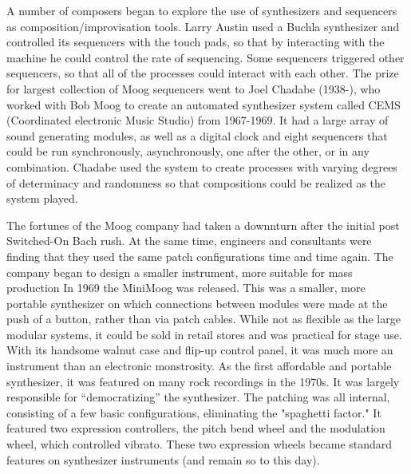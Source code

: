 A number of composers began to explore the use of synthesizers and sequencers as composition/improvisation tools. Larry Austin used a Buchla synthesizer and controlled its sequencers with the touch pads, so that by interacting with the machine he could control the rate of sequencing. Some sequencers triggered other sequencers, so that all of the processes could interact with each other. The prize for largest collection of Moog sequencers went to Joel Chadabe (1938-), who worked with Bob Moog to create an automated synthesizer system called CEMS (Coordinated electronic Music Studio) from 1967-1969. It had a large array of sound generating modules, as well as a digital clock and eight sequencers that could be run synchronously, asynchronously, one after the other, or in any combination. Chadabe used the system to create processes with varying degrees of determinacy and randomness so that compositions could be realized as the system played.

The fortunes of the Moog company had taken a downnturn after the initial post Switched-On Bach rush. At the same time, engineers and consultants were finding that they used the same patch configurations time and time again. The company began to design a smaller instrument, more suitable for mass production In 1969 the MiniMoog was released.  This was a smaller, more portable synthesizer on which connections between modules were made at the push of a button, rather than via patch cables. While not as flexible as the large modular systems, it could be sold in retail stores and was practical for stage use. With its handsome walnut case and flip-up control panel, it was much more an instrument than an electronic monstrosity. As the first affordable and portable synthesizer, it was featured on many rock recordings in the 1970s. It was largely responsible for ``democratizing'' the synthesizer. The patching was all internal, consisting of a few basic configurations, eliminating the "spaghetti factor." It featured two expression controllers, the pitch bend wheel and the modulation wheel, which controlled vibrato. These two expression wheels became standard features on synthesizer instruments (and remain so to this day).

